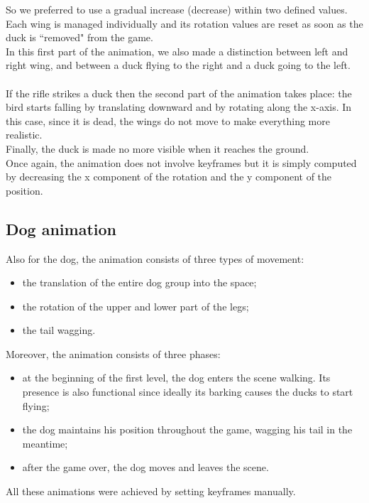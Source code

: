 \documentclass[12pt,a4paper]{article}
\begin{document}
	So we preferred to use a gradual increase (decrease) within two defined values. Each wing is managed individually and its rotation values are reset as soon as the duck is ``removed" from the game.\\
	In this first part of the animation, we also made a distinction between left and right wing, and between a duck flying to the right and a duck going to the left.\\
	\\
	If the rifle strikes a duck then the second part of the animation takes place: the bird starts falling by translating downward and by rotating along the x-axis. In this case, since it is dead, the wings do not move to make everything more realistic.\\
	Finally, the duck is made no more visible when it reaches the ground.\\ 
	Once again, the animation does not involve keyframes but it is simply computed by decreasing the x component of the rotation and the y component of the position. 
	\subsection{Dog animation}
	Also for the dog, the animation consists of three types of movement:
	\begin{itemize}
		\item the translation of the entire dog group into the space;
		\item the rotation of the upper and lower part of the legs;
		\item the tail wagging.
	\end{itemize}
	Moreover, the animation consists of three phases:
	\begin{itemize}
		\item at the beginning of the first level, the dog enters the scene walking. Its presence is also functional since ideally its barking causes the ducks to start flying;
		\item the dog maintains his position throughout the game, wagging his tail in the meantime;
		\item after the game over, the dog moves and leaves the scene.
	\end{itemize}
	All these animations were achieved by setting keyframes manually. 
	
\end{document}
